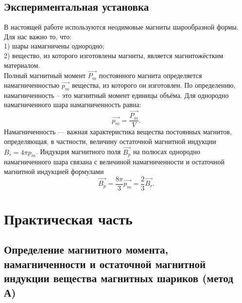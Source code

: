 \documentclass[a4paper,12pt]{article} %
\begin{document}
\subsection*{Экспериментальная установка}
В настоящей работе используются неодимовые магниты шарообразной формы.
Для нас важно то, что:\\
1) шары намагничены однородно;\\
2) вещество, из которого изготовлены магниты, является магнитожёстким материалом.\\
Полный магнитный момент $\overrightarrow{P_m}$
постоянного магнита определяется намагниченностью $\overrightarrow{p_m}$
вещества, из которого он изготовлен. По определению, намагниченность – это магнитный момент единицы объёма. Для однородно намагниченного шара намагниченность равна:
$$
\overrightarrow{p_m}=\dfrac{\overrightarrow{P_m}}{V}.
$$
Намагниченность — важная характеристика вещества постоянных магнитов, определяющая, в
частности, величину остаточной магнитной индукции $B_r = 4\pi p_m$. Индукция магнитного поля $\overrightarrow{B_p}$
на полюсах однородно намагниченного шара связана с величиной намагниченности и остаточной магнитной индукцией формулами
$$
\overrightarrow{B_p}=\dfrac{8\pi}{3}\overrightarrow{p_m}=\dfrac{2}{3}\overrightarrow{B_r}.
$$

\section{Практическая часть}
\subsection{Определение магнитного момента, намагниченности и остаточной магнитной
индукции вещества магнитных шариков (метод А)}
\end{document}
